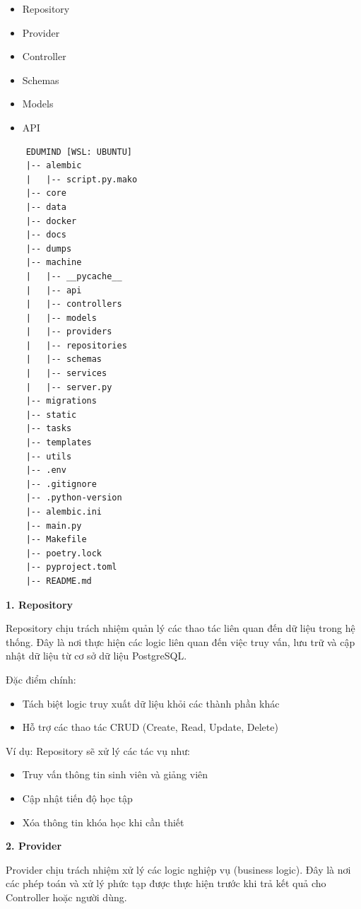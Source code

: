 \begin{itemize}
    \item Repository
    \item Provider
    \item Controller
    \item Schemas
    \item Models
    \item API
\end{itemize}
\newpage
\begin{verbatim}
    EDUMIND [WSL: UBUNTU]
    |-- alembic
    |   |-- script.py.mako
    |-- core
    |-- data
    |-- docker
    |-- docs
    |-- dumps
    |-- machine
    |   |-- __pycache__
    |   |-- api
    |   |-- controllers
    |   |-- models
    |   |-- providers
    |   |-- repositories
    |   |-- schemas
    |   |-- services
    |   |-- server.py
    |-- migrations
    |-- static
    |-- tasks
    |-- templates
    |-- utils
    |-- .env
    |-- .gitignore
    |-- .python-version
    |-- alembic.ini
    |-- main.py
    |-- Makefile
    |-- poetry.lock
    |-- pyproject.toml
    |-- README.md
    \end{verbatim}

\textbf{1. Repository} 

Repository chịu trách nhiệm quản lý các thao tác liên quan đến dữ liệu trong hệ thống. Đây là nơi thực hiện các logic liên quan đến việc truy vấn, lưu trữ và cập nhật dữ liệu từ cơ sở dữ liệu PostgreSQL.

Đặc điểm chính:

\begin{itemize}
    \item Tách biệt logic truy xuất dữ liệu khỏi các thành phần khác
    \item Hỗ trợ các thao tác CRUD (Create, Read, Update, Delete)
\end{itemize}

Ví dụ: Repository sẽ xử lý các tác vụ như:

\begin{itemize}
    \item Truy vấn thông tin sinh viên và giảng viên
    \item Cập nhật tiến độ học tập
    \item Xóa thông tin khóa học khi cần thiết
\end{itemize}

\textbf{2. Provider} 

Provider chịu trách nhiệm xử lý các logic nghiệp vụ (business logic). Đây là nơi các phép toán và xử lý phức tạp được thực hiện trước khi trả kết quả cho Controller hoặc người dùng.


